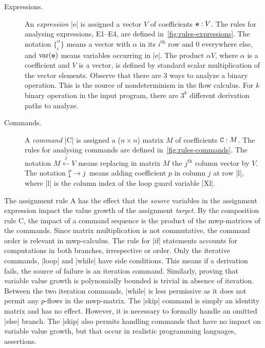\begin{description}
\item[Expressions.]
An \emph{expression} \pr|e| is assigned a vector \(V\) of coefficients \(\prm{e} : V\).
The rules for analysing expressions, E1--E4, are defined in~\autoref{fig:rules-expressions}.
The notation \(\{_{i}^{\alpha}\}\) means a vector with \(\alpha\) in its \(i^\text{th}\) row and $0$ everywhere else, and \(\var(\prm{e})\) means variables occurring in \pr|e|.
The product \(\alpha V\), where \(\alpha\) is a coefficient and \(V\) is a vector, is defined by
standard scalar multiplication of the vector elements.
Observe that there are 3 ways to analyze a binary operation.
This is the source of nondeterminism in the flow calculus.
For \(k\) binary operation in the input program, there are \(3^k\) different derivation paths to analyze.
\item[Commands.]
A \emph{command} \pr|C| is assigned a (\(n \times n\)) matrix \(M\) of coefficients \(\prm{C} : M\).
The rules for analysing commands are defined in~\autoref{fig:rules-commands}.
The notation \(M \xleftarrow{j} V\) means replacing in matrix $M$ the \(j^\text{th}\) column vector by $V$.
The notation \(_{\text{\pr|l|}}^{p}\rightarrow j\) means adding coefficient \(p\) in column \(j\) at row \pr|l|,
where \pr|l| is the column index of the loop guard variable \pr|Xl|.
\end{description}
The assignment rule A has the effect that the \emph{source} variables in the assignment expression impact the value growth of the assignment \emph{target}.
By the composition rule C, the impact of a command sequence is the product of the mwp-matrices of the commands.
Since matrix multiplication is not commutative, the command order is relevant in mwp-calculus.
The rule for \pr|if| statements accounts for computations in both branches, irrespective or order.
Only the iterative commands, \pr|loop| and \pr|while| have side conditions.
This means if a derivation fails, the source of failure is an iteration command.
Similarly, proving that variable value growth is polynomially bounded is trivial in absence of iteration.
Between the two iteration commands, \pr|while| is less permissive as it does not permit any \(p\)-flows in the mwp-matrix.
The \pr|skip| command is simply an identity matrix and has no effect.
However, it is necessary to formally handle \eg an omitted \pr|else| branch.
The \pr|skip| also permits handling commands that have no impact on variable value growth,
but that occur in realistic programming languages, \eg assertions.

